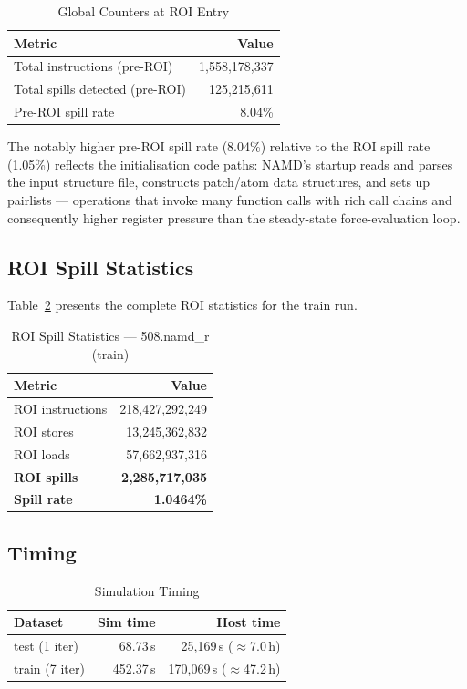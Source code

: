 \documentclass[conference]{IEEEtran}
\begin{document}
\begin{table}[H]
\centering
\caption{Global Counters at ROI Entry}
\label{tab:preroi}
\begin{tabular}{lr}
\toprule
\textbf{Metric} & \textbf{Value} \\
\midrule
Total instructions (pre-ROI) & 1,558,178,337 \\
Total spills detected (pre-ROI) & 125,215,611 \\
Pre-ROI spill rate & 8.04\% \\
\bottomrule
\end{tabular}
\end{table}

The notably higher pre-ROI spill rate (8.04\%) relative to the ROI
spill rate (1.05\%) reflects the initialisation code paths: NAMD's
startup reads and parses the input structure file, constructs
patch/atom data structures, and sets up pairlists --- operations that
invoke many function calls with rich call chains and consequently
higher register pressure than the steady-state force-evaluation loop.

\subsection{ROI Spill Statistics}

Table~\ref{tab:roi} presents the complete ROI statistics for the
train run.

\begin{table}[H]
\centering
\caption{ROI Spill Statistics --- 508.namd\_r (train)}
\label{tab:roi}
\begin{tabular}{lr}
\toprule
\textbf{Metric} & \textbf{Value} \\
\midrule
ROI instructions   & 218,427,292,249 \\
ROI stores         &  13,245,362,832 \\
ROI loads          &  57,662,937,316 \\
\midrule
\textbf{ROI spills} & \textbf{2,285,717,035} \\
\textbf{Spill rate} & \textbf{1.0464\%} \\
\bottomrule
\end{tabular}
\end{table}

\subsection{Timing}

\begin{table}[H]
\centering
\caption{Simulation Timing}
\label{tab:timing}
\begin{tabular}{lrr}
\toprule
\textbf{Dataset} & \textbf{Sim time} & \textbf{Host time} \\
\midrule
test (1 iter) &  68.73\,s &  25,169\,s ($\approx$7.0\,h) \\
train (7 iter) & 452.37\,s & 170,069\,s ($\approx$47.2\,h) \\
\bottomrule
\end{tabular}
\end{table}
\end{document}
